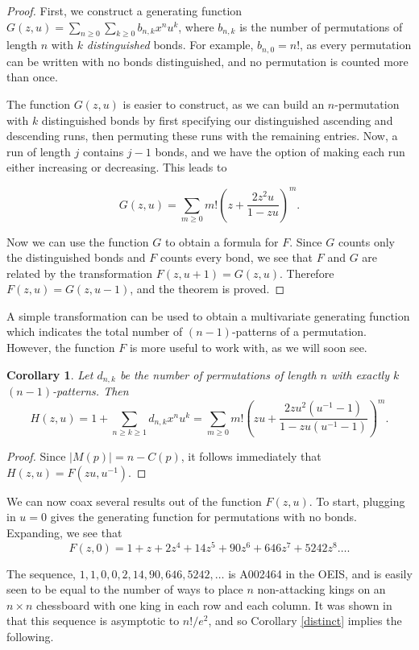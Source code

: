 \documentclass[11pt]{article}
\theoremstyle{plain}
\newtheorem{cor}[thm]{Corollary}
\theoremstyle{definition}
\newcommand{\dsum}{\sum_{n\geq 0} \sum_{k\geq 0}}
\begin{document}
  \begin{proof}
  First, we construct a generating function $G(z,u)= \dsum b_{n,k} x^n u^k$, where
  $b_{n,k}$ is the number of permutations of length $n$ with $k$
  \emph{distinguished} bonds. For example, $b_{n,0} = n!$, as every permutation
  can be written with no bonds distinguished, and no permutation is counted more
  than once. 

  The function $G(z,u)$ is easier to construct, as we can build an $n$-permutation
  with $k$ distinguished bonds by first specifying our distinguished ascending and
  descending runs, then permuting these runs with the remaining entries. Now, a
  run of length $j$ contains $j-1$ bonds, and we have the option of making each
  run either increasing or decreasing. This leads to 

  $$G(z,u) = \sum_{m\geq 0} m! \left(z+ \frac{2z^2 u}{1-zu} \right)^m.$$

  Now we can use the function $G$ to obtain a formula for $F$. Since $G$ counts
  only the distinguished bonds and $F$ counts every bond, we see that $F$ and $G$
  are related by the transformation $F(z,u+1) = G(z,u)$. Therefore $F(z,u) =
  G(z,u-1)$, and the theorem is proved.  
  \end{proof} 

  A simple transformation can be used to obtain a multivariate generating function
  which indicates the total number of $(n-1)$-patterns of a permutation.
  However, the function $F$ is more useful to work with, as we will soon see. 

  \begin{cor} 
    Let $d_{n,k}$ be the number of permutations of length $n$ with exactly $k$
    $(n-1)$-patterns. Then $$ H(z,u) = 1+  \sum_{n\geq k \geq 1} d_{n,k}
    x^n u^k = \sum_{m\geq
    0}m!\left(zu+\frac{2zu^2(u^{-1}-1)}{1-zu(u^{-1}-1)}\right)^m. $$
  \end{cor}
  \begin{proof}
    Since $|M(p)| = n-C(p)$, it follows immediately that $H(z,u) = F(zu, u^{-1})$. 
  \end{proof}


  We can now coax several results out of the function $F(z,u)$. To start,
  plugging in $u=0$ gives the generating function for permutations with no bonds.
  Expanding, we see that 
  $$F(z,0) = 1+z+2z^4+14z^5+90z^6+646z^7 + 5242z^8 \ldots.$$

  The sequence, $1,1,0,0,2,14,90,646,5242, \ldots$ is A002464 in the OEIS, and is
  easily seen to be equal to the number of ways to place $n$ non-attacking kings
  on an $n \times n$ chessboard with one king in each row and each column. It was
  shown in \cite{tauraso} that this sequence is asymptotic to $n!/e^2$, and so
  Corollary \ref{distinct} implies the following. 
\end{document}

